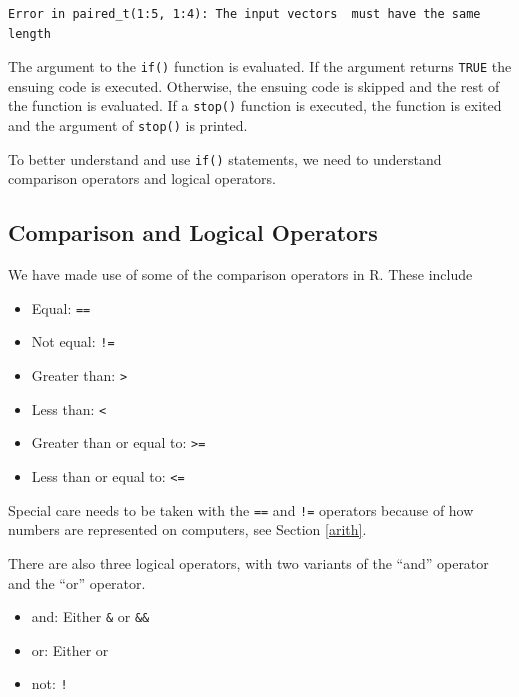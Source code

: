 \documentclass[
]{krantz}
\providecommand{\tightlist}{%
  \setlength{\itemsep}{0pt}\setlength{\parskip}{0pt}}
\begin{document}
\begin{verbatim}
Error in paired_t(1:5, 1:4): The input vectors  must have the same length
\end{verbatim}

The argument to the \texttt{if()} function is evaluated. If the argument returns \texttt{TRUE} the ensuing code is executed. Otherwise, the ensuing code is skipped and the rest of the function is evaluated. If a \texttt{stop()} function is executed, the function is exited and the argument of \texttt{stop()} is printed.

To better understand and use \texttt{if()} statements, we need to understand comparison operators and logical operators.

\hypertarget{comparison-and-logical-operators}{%
\subsection{Comparison and Logical Operators}\label{comparison-and-logical-operators}}

We have made use of some of the comparison operators in R. These include

\begin{itemize}
\tightlist
\item
  Equal: \texttt{==}
\item
  Not equal: \texttt{!=}
\item
  Greater than: \texttt{\textgreater{}}
\item
  Less than: \texttt{\textless{}}
\item
  Greater than or equal to: \texttt{\textgreater{}=}
\item
  Less than or equal to: \texttt{\textless{}=}
\end{itemize}

Special care needs to be taken with the \texttt{==} and \texttt{!=} operators because of how numbers are represented on computers, see Section \ref{arith}.

There are also three logical operators, with two variants of the ``and'' operator and the ``or'' operator.

\begin{itemize}
\tightlist
\item
  and: Either \texttt{\&} or \texttt{\&\&}
\item
  or: Either \texttt{\textbar{}} or \texttt{\textbar{}\textbar{}}
\item
  not: \texttt{!}
\end{itemize}
\end{document}

